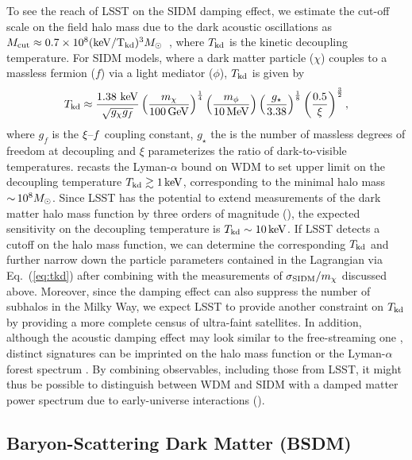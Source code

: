 To see the reach of LSST on the SIDM damping effect, we estimate the cut-off scale on the field halo mass due to the dark acoustic oscillations as $M_{\rm cut}\approx0.7\times10^{8}({\rm keV/T_{\rm kd}})^3 M_\odot$~\citep{1512.05349}, where $T_{\rm kd}$ is the kinetic decoupling temperature. For SIDM models, where a dark matter particle ($\chi$) couples to a massless fermion ($f$) via a light mediator ($\phi$), $T_{\rm kd}$ is given by~\citep{Aarssen:2012fx,Cyr-Racine:2015ihg}
\begin{equation}
T_{\rm kd}\approx\frac{1.38~{\rm keV}}{\sqrt{g_\chi g_f}}\left(\frac{m_\chi}{100 \mathrm{\,GeV}}\right)^{\frac{1}{4}}\left(\frac{m_\phi}{10 \mathrm{\,MeV}}\right)\left(\frac{g_\star}{3.38}\right)^{\frac{1}{8}}\left(\frac{0.5}{\xi}\right)^{\frac{3}{2}},
\label{eq:tkd}
\end{equation}
where $g_f$ is the $\xi\textup{--}f$ coupling constant, $g_\star$ the is the number of massless degrees of freedom at decoupling and $\xi$ parameterizes the ratio of dark-to-visible temperatures. \citet{Huo:2017vef} recasts the Lyman-$\alpha$ bound on WDM to set upper limit on the decoupling temperature $T_{\rm kd}\gtrsim 1 \mathrm{\,keV}$, corresponding to the minimal halo mass $ {\sim}\, 10^8 M_\odot$. Since LSST has the potential to extend measurements of the dark matter halo mass function by three orders of magnitude (), the expected sensitivity on the decoupling temperature is $T_{\rm kd}\sim 10 \mathrm{\,keV}$. If LSST detects a cutoff on the halo mass function, we can determine the corresponding $T_{\rm kd}$ and further narrow down the particle parameters contained in the Lagrangian via Eq.~(\ref{eq:tkd}) after combining with the measurements of $\sigma_{\rm SIDM}/m_\chi$ discussed above. Moreover, since the damping effect can also suppress the number of subhalos in the Milky Way, we expect LSST to provide another constraint on $T_{\rm kd}$ by providing a more complete census of ultra-faint satellites. In addition, although the acoustic damping effect may look similar to the free-streaming one \citep[\eg][]{1512.05349}, distinct signatures can be imprinted on the halo mass function \citep{Buckley:2014ab,Sameie:2018juk} or the Lyman-$\alpha$ forest spectrum \citep{Krall:2017xcw,Bose:2018juc}. By combining observables, including those from LSST, it might thus be possible to distinguish between WDM and SIDM with a damped matter power spectrum due to early-universe interactions ().

     
\subsection{Baryon-Scattering Dark Matter (BSDM) }
\label{sec:bsdm}

